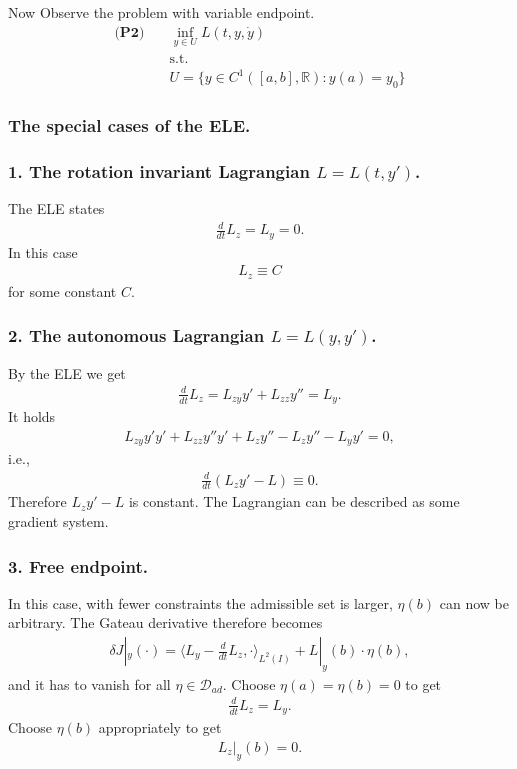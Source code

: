 \documentclass[a4paper,11pt,fleqn]{book}
\theoremstyle{definition}
\theoremstyle{remark}
\begin{document}
Now Observe the problem with variable endpoint. 
\begin{equation}
\begin{aligned}
\textbf{(P2)} \quad
	& \inf_{y \in U} L(t, y, \dot{y})\\
	& \text{s.t.}\\
	& U = \{y \in C^1([a, b], \mathbb{R}) : y(a) = y_0\}
\end{aligned}
\end{equation}


\subsubsection{The special cases of the ELE.}
\subsubsection{1. The rotation invariant Lagrangian $L = L(t, y')$.}
The ELE states
\begin{align*}
	\frac{d}{dt}L_z = L_y = 0. 
\end{align*}
In this case 
\begin{align*}
	L_z \equiv C
\end{align*}
for some constant $C$. 

\subsubsection{2. The autonomous Lagrangian $L = L(y, y')$.}
By the ELE we get 
\begin{align*}
	\frac{d}{dt}L_z = L_{zy} y' + L_{zz} y'' = L_y.  
\end{align*}
It holds
\begin{align*}
	L_{zy} y' y' + L_{zz} y'' y' + L_z y'' - L_z y'' - L_y y' = 0,
\end{align*}
i.e., 
\begin{align*}
	\frac{d}{dt}(L_z y' - L) \equiv 0.
\end{align*}
Therefore $L_z y' - L$ is constant. The Lagrangian can be described as some gradient system. 

\subsubsection{3. Free endpoint. }
In this case, with fewer constraints the admissible set is larger, $\eta(b)$ can now be arbitrary. The Gateau derivative therefore becomes
\begin{align*}
	\delta J|_y(\cdot ) = \langle L_y - \frac{d}{dt}L_z, \cdot \rangle_{L^2(I)} + L|_y(b) \cdot \eta(b),
\end{align*} 
and it has to vanish for all $\eta \in \mathcal{D}_{ad}$.  Choose $\eta(a) = \eta(b) = 0$ to get
\begin{align*}
	\frac{d}{dt}L_z = L_y. 
\end{align*} Choose $\eta(b)$ appropriately to get
\begin{align*}
	L_z|_y (b) = 0. 
\end{align*}
\end{document}
